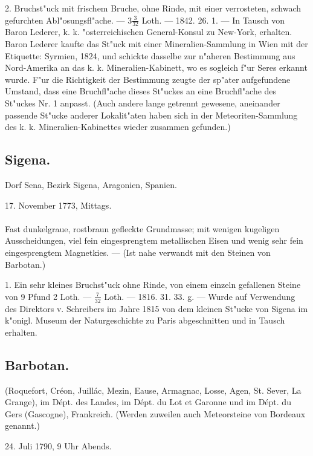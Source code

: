\documentclass[a4paper, 11pt, oneside, polutonikogreek, german]{article}
\begin{document}
2. Bruchst"uck mit frischem Bruche, ohne Rinde, mit einer verrosteten, schwach gefurchten Abl"osungsfl"ache. --- $3\frac{3}{32}$ Loth. --- 1842. 26. 1. --- In Tausch von Baron Lederer, k. k. "osterreichischen General-Konsul zu New-York, erhalten. Baron Lederer kaufte das St"uck mit einer Mineralien-Sammlung in Wien mit der Etiquette: Syrmien, 1824, und schickte dasselbe zur n"aheren Bestimmung aus Nord-Amerika an das k. k. Mineralien-Kabinett, wo es sogleich f"ur Seres erkannt wurde. F"ur die Richtigkeit der Bestimmung zeugte der sp"ater aufgefundene Umstand, dass eine Bruchfl"ache dieses St"uckes an eine Bruchfl"ache des St"uckes Nr. 1 anpasst. (Auch andere lange getrennt gewesene, aneinander passende St"ucke anderer Lokalit"aten haben sich in der Meteoriten-Sammlung des k. k. Mineralien-Kabinettes wieder zusammen gefunden.)
\subsection{Sigena.}
\begin{center}
\small
Dorf Sena, Bezirk Sigena, Aragonien, Spanien.

17. November 1773, Mittags.
\end{center}
\paragraph{}
Fast dunkelgraue, rostbraun gefleckte Grundmasse; mit wenigen kugeligen Ausscheidungen, viel fein eingesprengtem metallischen Eisen und wenig sehr fein eingesprengtem Magnetkies. --- (Ist nahe verwandt mit den Steinen von Barbotan.)

1. Ein sehr kleines Bruchst"uck ohne Rinde, von einem einzeln gefallenen Steine von 9 Pfund 2 Loth. --- $\frac{7}{32}$ Loth. --- 1816. 31. 33. g. --- Wurde auf Verwendung des Direktors v. Schreibers im Jahre 1815 von dem kleinen St"ucke von Sigena im k"onigl. Museum der Naturgeschichte zu Paris abgeschnitten und in Tausch erhalten.
\subsection{Barbotan.}
\begin{center}
\small
(Roquefort, Créon, Juillác, Mezin, Eause, Armagnac, Losse, Agen, St. Sever, La Grange), im Dépt. des Landes, im Dépt. du Lot et Garonne und im Dépt. du Gers (Gascogne), Frankreich. (Werden zuweilen auch Meteorsteine von Bordeaux genannt.)

24. Juli 1790, 9 Uhr Abends.
\end{center}
\end{document}
